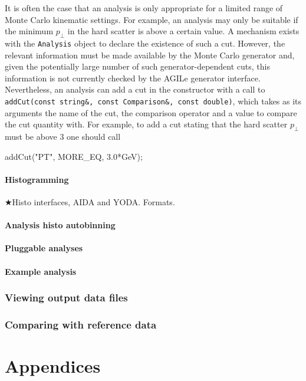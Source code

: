 \documentclass{JHEP3}
\DeclareRobustCommand{\TODO}[1]{\ensuremath{\bigstar}{#1}\xspace}
\newenvironment{snippet}{\Verbatim}{\endVerbatim}
\newcommand{\code}[1]{\texttt{#1}\xspace}
\newcommand{\pT}{\ensuremath{p_\perp}\xspace}
\begin{document}
It is often the case that an analysis is only appropriate for a limited range of
Monte Carlo kinematic settings.  For example, an analysis may only be suitable
if the minimum \pT in the hard scatter is above a certain value.  A mechanism
exists with the \code{Analysis} object to declare the existence of such a cut.
However, the relevant information must be made available by the Monte Carlo
generator and, given the potentially large number of such generator-dependent
cuts, this information is not currently checked by the AGILe generator
interface.  Nevertheless, an analysis can add a cut in the constructor with a
call to \code{addCut(const string\&, const Comparison\&, const double)}, which
takes as its arguments the name of the cut, the comparison operator and a value
to compare the cut quantity with.  For example, to add a cut stating that the
hard scatter \pT must be above \unit{3}{\GeV} one should call

\begin{snippet}
  addCut("PT", MORE_EQ, 3.0*GeV);
\end{snippet}



\subsection{Histogramming}
\TODO{Histo interfaces, AIDA and YODA. Formats.}

\subsection{Analysis histo autobinning}
\subsection{Pluggable analyses}
\subsection{Example analysis}

\section{Viewing output data files}

\section{Comparing with reference data}


\cleardoublepage
\part{Appendices}
\appendix
\end{document}
